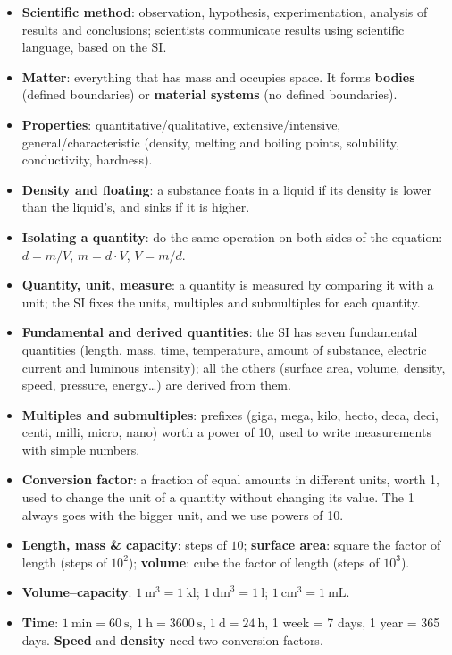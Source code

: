 \begin{itemize}
    \item \textbf{Scientific method}: observation, hypothesis, experimentation, analysis of results and conclusions; scientists communicate results using scientific language, based on the SI.
    \item \textbf{Matter}: everything that has mass and occupies space. It forms \textbf{bodies} (defined boundaries) or \textbf{material systems} (no defined boundaries).
    \item \textbf{Properties}: quantitative/qualitative, extensive/intensive, general/characteristic (density, melting and boiling points, solubility, conductivity, hardness).
    \item \textbf{Density and floating}: a substance floats in a liquid if its density is lower than the liquid's, and sinks if it is higher.
    \item \textbf{Isolating a quantity}: do the same operation on both sides of the equation: \(d = m/V\), \(m = d \cdot V\), \(V = m/d\).
    \item \textbf{Quantity, unit, measure}: a quantity is measured by comparing it with a unit; the SI fixes the units, multiples and submultiples for each quantity.
    \item \textbf{Fundamental and derived quantities}: the SI has seven fundamental quantities (length, mass, time, temperature, amount of substance, electric current and luminous intensity); all the others (surface area, volume, density, speed, pressure, energy\ldots) are derived from them.
    \item \textbf{Multiples and submultiples}: prefixes (giga, mega, kilo, hecto, deca, deci, centi, milli, micro, nano) worth a power of 10, used to write measurements with simple numbers.
    \item \textbf{Conversion factor}: a fraction of equal amounts in different units, worth 1, used to change the unit of a quantity without changing its value. The 1 always goes with the bigger unit, and we use powers of 10.
    \item \textbf{Length, mass \& capacity}: steps of \(10\); \textbf{surface area}: square the factor of length (steps of \(10^{2}\)); \textbf{volume}: cube the factor of length (steps of \(10^{3}\)).
    \item \textbf{Volume--capacity}: \(\qty{1}{\cubic\metre} = \qty{1}{\kilo\litre}\); \(\qty{1}{\cubic\dm} = \qty{1}{\litre}\); \(\qty{1}{\cubic\cm} = \qty{1}{\mL}\).
    \item \textbf{Time}: \(\qty{1}{\minute} = \qty{60}{\s}\), \(\qty{1}{\hour} = \qty{3600}{\s}\), \(\qty{1}{\day} = \qty{24}{\hour}\), 1 week = 7 days, 1 year = 365 days. \textbf{Speed} and \textbf{density} need two conversion factors.

\end{itemize}
